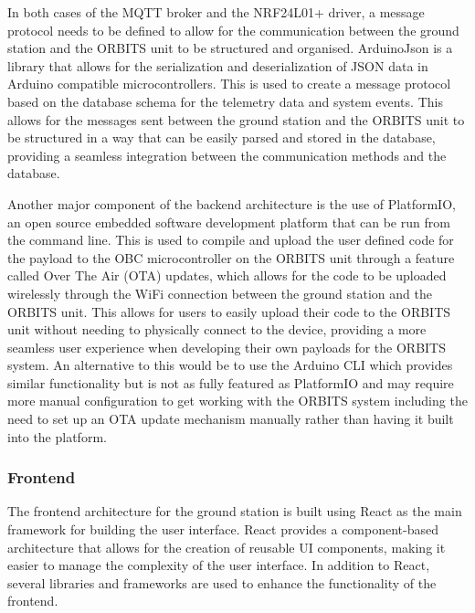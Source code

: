 \documentclass[a4paper,12pt,titlepage]{report}
\begin{document}
In both cases of the MQTT broker and the NRF24L01+ driver, a message protocol needs to be defined to allow for the communication between the ground station and the ORBITS unit to be structured and organised. ArduinoJson is a library that allows for the serialization and deserialization of JSON data in Arduino compatible microcontrollers. This is used to create a message protocol based on the database schema for the telemetry data and system events. This allows for the messages sent between the ground station and the ORBITS unit to be structured in a way that can be easily parsed and stored in the database, providing a seamless integration between the communication methods and the database.

Another major component of the backend architecture is the use of PlatformIO, an open source embedded software development platform that can be run from the command line. This is used to compile and upload the user defined code for the payload to the OBC microcontroller on the ORBITS unit through a feature called Over The Air (OTA) updates, which allows for the code to be uploaded wirelessly through the WiFi connection between the ground station and the ORBITS unit. This allows for users to easily upload their code to the ORBITS unit without needing to physically connect to the device, providing a more seamless user experience when developing their own payloads for the ORBITS system. An alternative to this would be to use the Arduino CLI which provides similar functionality but is not as fully featured as PlatformIO and may require more manual configuration to get working with the ORBITS system including the need to set up an OTA update mechanism manually rather than having it built into the platform.


\subsubsection{Frontend}
The frontend architecture for the ground station is built using React as the main framework for building the user interface. React provides a component-based architecture that allows for the creation of reusable UI components, making it easier to manage the complexity of the user interface. In addition to React, several libraries and frameworks are used to enhance the functionality of the frontend.
\end{document}
